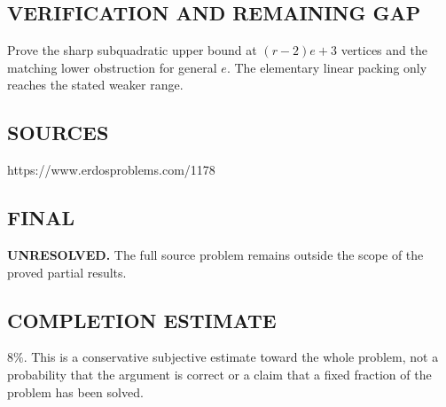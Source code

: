 \subsection*{VERIFICATION AND REMAINING GAP}
Prove the sharp subquadratic upper bound at $(r-2)e+3$ vertices and the
matching lower obstruction for general $e$. The elementary linear packing
only reaches the stated weaker range.

\subsection*{SOURCES}
https://www.erdosproblems.com/1178

\subsection*{FINAL}
\textbf{UNRESOLVED.} The full source problem remains outside the scope of the proved partial results.

\subsection*{COMPLETION ESTIMATE}
$8\%$. This is a conservative subjective estimate toward the whole problem, not a probability that the argument is correct or a claim that a fixed fraction of the problem has been solved.
